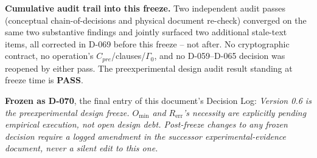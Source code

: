 \documentclass[11pt,a4paper]{article}
\begin{document}
\textbf{Cumulative audit trail into this freeze.} Two independent audit passes (conceptual chain-of-decisions and physical document re-check) converged on the same two substantive findings and jointly surfaced two additional stale-text items, all corrected in D-069 before this freeze -- not after. No cryptographic contract, no operation's $C_{pre}$/clauses/$\Gamma_0$, and no D-059--D-065 decision was reopened by either pass. The preexperimental design audit result standing at freeze time is \textbf{PASS}.

\textbf{Frozen as D-070}, the final entry of this document's Decision Log: \emph{Version 0.6 is the preexperimental design freeze. $O_{\min}$ and $R_{\text{err}}$'s necessity are explicitly pending empirical execution, not open design debt. Post-freeze changes to any frozen decision require a logged amendment in the successor experimental-evidence document, never a silent edit to this one.}
\end{document}
